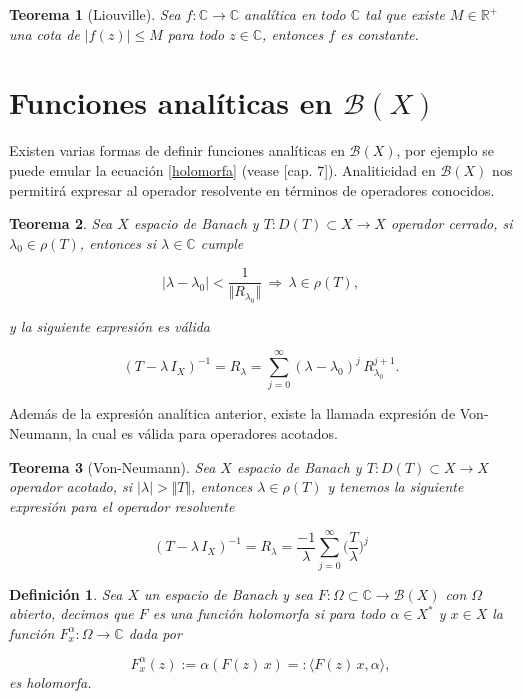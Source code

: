 \documentclass[letterpaper]{report}
\newtheorem{teorema}{Teorema}[chapter]
\newtheorem{def.}{Definici\'on}[chapter]
\newcommand{\co}{\ensuremath{\mathbb C }}
\newcommand{\re}{\ensuremath{\mathbb R }}
\begin{document}
\begin{teorema}[Liouville]
Sea $f:\co\rightarrow\co$ analítica en todo $\co$ tal que existe $M\in\re^+$ una cota de $\vert f(z)\vert\leq M$ para todo $z\in\co$, entonces $f$ es constante.
\end{teorema}

\section{Funciones analíticas en $\mathcal{B}(X)$}

\noindent Existen varias formas de definir funciones analíticas en $\mathcal{B}(X)$, por ejemplo se puede emular la ecuación \ref{holomorfa} (vease \cite{canavati}[cap. 7]). Analiticidad en $\mathcal{B}(X)$ nos permitirá expresar al operador resolvente en términos de operadores conocidos.  

\begin{teorema}\label{res-analyt}
Sea $X$ espacio de Banach y $T:D(T)\subset X\rightarrow X$ operador cerrado, si $\lambda_0\in\rho(T)$, entonces si $\lambda\in\co$ cumple

$$\vert\lambda-\lambda_0\vert<\frac{1}{\Vert R_{\lambda_0}\Vert}\,\Rightarrow\,\lambda\in\rho(T),$$

y la siguiente expresión es válida

\begin{equation}
(T-\lambda\,I_X)^{-1}=R_{\lambda}=\sum_{j=0}^{\infty}(\lambda-\lambda_0)^j\,R_{\lambda_0}^{j+1}.
\end{equation}
\end{teorema}

\noindent Además de la expresión analítica anterior, existe la llamada expresión de Von-Neumann, la cual es válida para operadores acotados. 

\begin{teorema}[Von-Neumann]\label{von-neumann}
Sea $X$ espacio de Banach y $T:D(T)\subset X\rightarrow X$ operador acotado, si $\vert\lambda\vert>\Vert T\Vert$, entonces $\lambda\in\rho(T)$ y tenemos la siguiente expresión para el operador resolvente

\begin{equation}
(T-\lambda\,I_X)^{-1}=R_{\lambda}=\frac{-1}{\lambda}\sum_{j=0}^{\infty}\Big(\frac{T}{\lambda}\Big)^j
\end{equation}
\end{teorema}

\begin{def.}
Sea $X$ un espacio de Banach y sea $F:\Omega\subset\co\rightarrow\mathcal{B}(X)$ con $\Omega$ abierto, decimos que $F$ es una función holomorfa si para todo $\alpha\in X^*$ y $x\in X$ la función $F_{x}^{\alpha}:\Omega\rightarrow\co$ dada por

\begin{equation}
F_{x}^{\alpha}(z):=\alpha(F(z)\,x)=:\langle F(z)\,x,\alpha\rangle,
\end{equation} 
es holomorfa.
\end{def.}
\end{document}
